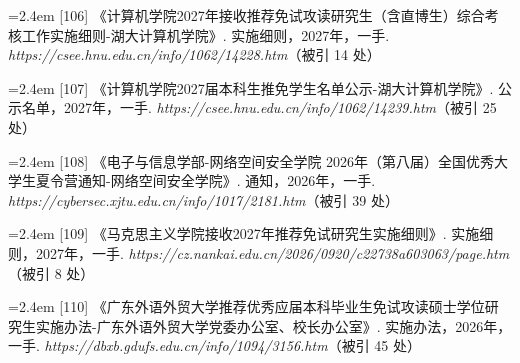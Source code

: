 {\vspace{0.6pt}
\noindent\hangindent=2.4em \label{src:S0130}{\color{cAccent}[106]} 《计算机学院2027年接收推荐免试攻读研究生（含直博生）综合考核工作实施细则-湖大计算机学院》. 实施细则，2027年，一手. \textit{https://csee.hnu.edu.cn/info/1062/14228.htm}（被引 14 处）\par
\vspace{0.6pt}
\noindent\hangindent=2.4em \label{src:S0131}{\color{cAccent}[107]} 《计算机学院2027届本科生推免学生名单公示-湖大计算机学院》. 公示名单，2027年，一手. \textit{https://csee.hnu.edu.cn/info/1062/14239.htm}（被引 25 处）\par
\vspace{0.6pt}
\vspace{3.5pt}\par
\nopagebreak\vspace{1pt}
\noindent\hangindent=2.4em \label{src:S0132}{\color{cAccent}[108]} 《电子与信息学部-网络空间安全学院 2026年（第八届）全国优秀大学生夏令营通知-网络空间安全学院》. 通知，2026年，一手. \textit{https://cybersec.xjtu.edu.cn/info/1017/2181.htm}（被引 39 处）\par
\vspace{0.6pt}
\vspace{3.5pt}\par
\nopagebreak\vspace{1pt}
\noindent\hangindent=2.4em \label{src:S0133}{\color{cAccent}[109]} 《马克思主义学院接收2027年推荐免试研究生实施细则》. 实施细则，2027年，一手. \textit{https://cz.nankai.edu.cn/2026/0920/c22738a603063/page.htm}（被引 8 处）\par
\vspace{0.6pt}
\vspace{3.5pt}\par
\nopagebreak\vspace{1pt}
\noindent\hangindent=2.4em \label{src:S0134}{\color{cAccent}[110]} 《广东外语外贸大学推荐优秀应届本科毕业生免试攻读硕士学位研究生实施办法-广东外语外贸大学党委办公室、校长办公室》. 实施办法，2026年，一手. \textit{https://dbxb.gdufs.edu.cn/info/1094/3156.htm}（被引 45 处）\par
\vspace{0.6pt}
\vspace{3.5pt}\par
\nopagebreak\vspace{1pt}
}
